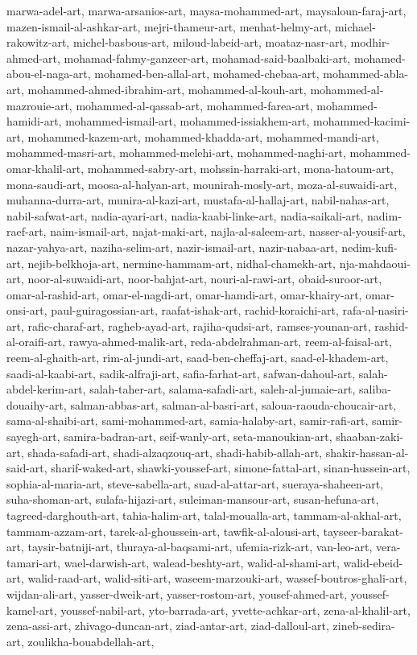 \documentclass{article}
\begin{document}
marwa-adel-art,
marwa-arsanios-art,
maysa-mohammed-art,
maysaloun-faraj-art,
mazen-ismail-al-ashkar-art,
mejri-thameur-art,
menhat-helmy-art,
michael-rakowitz-art,
michel-basbous-art,
miloud-labeid-art,
moataz-nasr-art,
modhir-ahmed-art,
mohamad-fahmy-ganzeer-art,
mohamad-said-baalbaki-art,
mohamed-abou-el-naga-art,
mohamed-ben-allal-art,
mohamed-chebaa-art,
mohammed-abla-art,
mohammed-ahmed-ibrahim-art,
mohammed-al-kouh-art,
mohammed-al-mazrouie-art,
mohammed-al-qassab-art,
mohammed-farea-art,
mohammed-hamidi-art,
mohammed-ismail-art,
mohammed-issiakhem-art,
mohammed-kacimi-art,
mohammed-kazem-art,
mohammed-khadda-art,
mohammed-mandi-art,
mohammed-masri-art,
mohammed-melehi-art,
mohammed-naghi-art,
mohammed-omar-khalil-art,
mohammed-sabry-art,
mohssin-harraki-art,
mona-hatoum-art,
mona-saudi-art,
moosa-al-halyan-art,
mounirah-mosly-art,
moza-al-suwaidi-art,
muhanna-durra-art,
munira-al-kazi-art,
mustafa-al-hallaj-art,
nabil-nahas-art,
nabil-safwat-art,
nadia-ayari-art,
nadia-kaabi-linke-art,
nadia-saikali-art,
nadim-raef-art,
naim-ismail-art,
najat-maki-art,
najla-al-saleem-art,
nasser-al-yousif-art,
nazar-yahya-art,
naziha-selim-art,
nazir-ismail-art,
nazir-nabaa-art,
nedim-kufi-art,
nejib-belkhoja-art,
nermine-hammam-art,
nidhal-chamekh-art,
nja-mahdaoui-art,
noor-al-suwaidi-art,
noor-bahjat-art,
nouri-al-rawi-art,
obaid-suroor-art,
omar-al-rashid-art,
omar-el-nagdi-art,
omar-hamdi-art,
omar-khairy-art,
omar-onsi-art,
paul-guiragossian-art,
raafat-ishak-art,
rachid-koraichi-art,
rafa-al-nasiri-art,
rafic-charaf-art,
ragheb-ayad-art,
rajiha-qudsi-art,
ramses-younan-art,
rashid-al-oraifi-art,
rawya-ahmed-malik-art,
reda-abdelrahman-art,
reem-al-faisal-art,
reem-al-ghaith-art,
rim-al-jundi-art,
saad-ben-cheffaj-art,
saad-el-khadem-art,
saadi-al-kaabi-art,
sadik-alfraji-art,
safia-farhat-art,
safwan-dahoul-art,
salah-abdel-kerim-art,
salah-taher-art,
salama-safadi-art,
saleh-al-jumaie-art,
saliba-douaihy-art,
salman-abbas-art,
salman-al-basri-art,
saloua-raouda-choucair-art,
sama-al-shaibi-art,
sami-mohammed-art,
samia-halaby-art,
samir-rafi-art,
samir-sayegh-art,
samira-badran-art,
seif-wanly-art,
seta-manoukian-art,
shaaban-zaki-art,
shada-safadi-art,
shadi-alzaqzouq-art,
shadi-habib-allah-art,
shakir-hassan-al-said-art,
sharif-waked-art,
shawki-youssef-art,
simone-fattal-art,
sinan-hussein-art,
sophia-al-maria-art,
steve-sabella-art,
suad-al-attar-art,
sueraya-shaheen-art,
suha-shoman-art,
sulafa-hijazi-art,
suleiman-mansour-art,
susan-hefuna-art,
tagreed-darghouth-art,
tahia-halim-art,
talal-moualla-art,
tammam-al-akhal-art,
tammam-azzam-art,
tarek-al-ghoussein-art,
tawfik-al-alousi-art,
tayseer-barakat-art,
taysir-batniji-art,
thuraya-al-baqsami-art,
ufemia-rizk-art,
van-leo-art,
vera-tamari-art,
wael-darwish-art,
walead-beshty-art,
walid-al-shami-art,
walid-ebeid-art,
walid-raad-art,
walid-siti-art,
waseem-marzouki-art,
wassef-boutros-ghali-art,
wijdan-ali-art,
yasser-dweik-art,
yasser-rostom-art,
yousef-ahmed-art,
youssef-kamel-art,
youssef-nabil-art,
yto-barrada-art,
yvette-achkar-art,
zena-al-khalil-art,
zena-assi-art,
zhivago-duncan-art,
ziad-antar-art,
ziad-dalloul-art,
zineb-sedira-art,
zoulikha-bouabdellah-art,
\end{document}
